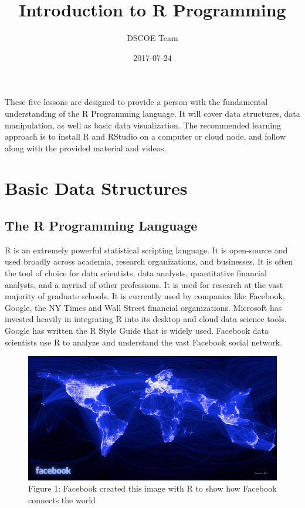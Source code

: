 \documentclass[]{book}
\title{Introduction to R Programming}
\author{DSCOE Team}
\date{2017-07-24}
\begin{document}
\maketitle

{
\setcounter{tocdepth}{1}
\tableofcontents
}
These five lessons are designed to provide a person with the fundamental
understanding of the R Programming language. It will cover data
structures, data manipulation, as well as basic data visualization. The
recommended learning approach is to install R and RStudio on a computer
or cloud node, and follow along with the provided material and videos.

\chapter{Basic Data Structures}\label{basic-data-structures}

\section{The R Programming Language}\label{the-r-programming-language}

R is an extremely powerful statistical scripting language. It is
open-source and used broadly across academia, research organizations,
and businesses. It is often the tool of choice for data scientists, data
analysts, quantitative financial analysts, and a myriad of other
professions. It is used for research at the vast majority of graduate
schools. It is currently used by companies like Facebook, Google, the NY
Times and Wall Street financial organizations. Microsoft has invested
heavily in integrating R into its desktop and cloud data science tools.
Google has written the R Style Guide that is widely used. Facebook data
scientists use R to analyze and understand the vast Facebook social
network.

\begin{figure}[htbp]
\centering
\includegraphics{facebook.png}
\caption{Figure 1: Facebook created this image with R to show how
Facebook connects the world}
\end{figure}
\end{document}
